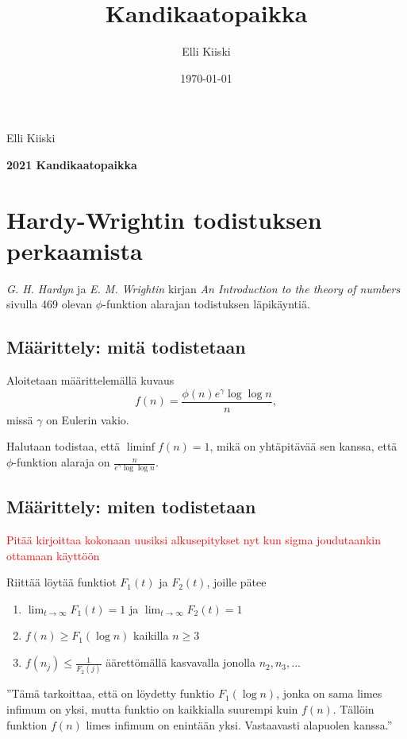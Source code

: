 \documentclass{article}
\title{Kandikaatopaikka}
\author{Elli Kiiski}
\date{\today}
\theoremstyle{definition}
\begin{document}
{\large
Elli Kiiski
\par
\textbf{2021 Kandikaatopaikka}
}
\vspace{0.5cm}

\section{Hardy-Wrightin todistuksen perkaamista}

\textit{G. H. Hardyn} ja \textit{E. M. Wrightin} kirjan \textit{An Introduction to the theory of numbers} sivulla 469 olevan $\phi$-funktion alarajan todistuksen läpikäyntiä.

\subsection{Määrittely: mitä todistetaan}

Aloitetaan määrittelemällä kuvaus
\begin{equation*}
    f(n)= \frac{\phi(n)e^\gamma \log\log n}{n},
\end{equation*}
missä $\gamma$ on Eulerin vakio.

Halutaan todistaa, että $\liminf f(n)=1$, mikä on yhtäpitävää sen kanssa, että $\phi$-funktion alaraja on $\frac{n}{e^\gamma \log\log n}$.

\subsection{Määrittely: miten todistetaan}

\textcolor{red}{Pitää kirjoittaa kokonaan uusiksi alkusepitykset nyt kun sigma joudutaankin ottamaan käyttöön}

Riittää löytää funktiot $F_1(t)$ ja $F_2(t)$, joille pätee
\begin{enumerate}
\label{ehdot}
    \item $\lim_{t\rightarrow \infty} F_1(t) = 1$ ja $\lim_{t\rightarrow \infty} F_2(t) = 1$
    \item $f(n) \geq F_1(\log n)$ kaikilla $n\geq 3$
    \item $f(n_j) \leq \frac{1}{F_2(j)}$ äärettömällä kasvavalla jonolla $n_2, n_3,...$
\end{enumerate}

''Tämä tarkoittaa, että on löydetty funktio $F_1(\log n)$, jonka on sama limes infimum on yksi, mutta funktio on kaikkialla suurempi kuin $f(n)$. Tällöin funktion $f(n)$ limes infimum on enintään yksi. Vastaavasti alapuolen kanssa.''
\end{document}
